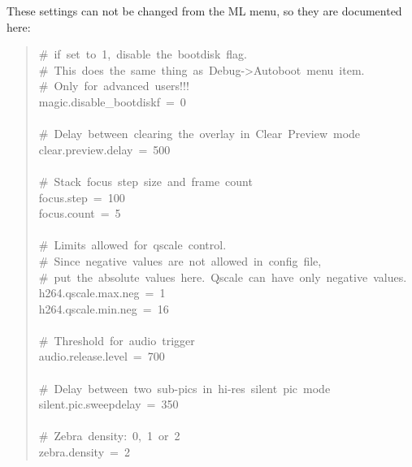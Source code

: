 \documentclass[a4paper,english]{article}
\begin{document}
These settings can not be changed from the ML menu, so they are documented here:
%
\begin{quote}{\ttfamily \raggedright \noindent
\#~if~set~to~1,~disable~the~bootdisk~flag.\\
\#~This~does~the~same~thing~as~Debug->Autoboot~menu~item.\\
\#~Only~for~advanced~users!!!\\
magic.disable\_bootdiskf~=~0\\
~\\
\#~Delay~between~clearing~the~overlay~in~Clear~Preview~mode\\
clear.preview.delay~=~500\\
~\\
\#~Stack~focus~step~size~and~frame~count\\
focus.step~=~100\\
focus.count~=~5\\
~\\
\#~Limits~allowed~for~qscale~control.\\
\#~Since~negative~values~are~not~allowed~in~config~file,\\
\#~put~the~absolute~values~here.~Qscale~can~have~only~negative~values.\\
h264.qscale.max.neg~=~1\\
h264.qscale.min.neg~=~16\\
~\\
\#~Threshold~for~audio~trigger\\
audio.release.level~=~700\\
~\\
\#~Delay~between~two~sub-pics~in~hi-res~silent~pic~mode\\
silent.pic.sweepdelay~=~350\\
~\\
\#~Zebra~density:~0,~1~or~2\\
zebra.density~=~2
}
\end{quote}
\end{document}
